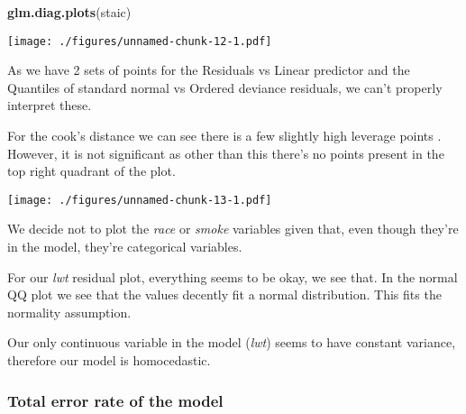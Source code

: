 \documentclass[]{article}
\newenvironment{Shaded}{\begin{snugshade}}{\end{snugshade}}
\newcommand{\DataTypeTok}[1]{\textcolor[rgb]{0.13,0.29,0.53}{#1}}
\newcommand{\DecValTok}[1]{\textcolor[rgb]{0.00,0.00,0.81}{#1}}
\newcommand{\KeywordTok}[1]{\textcolor[rgb]{0.13,0.29,0.53}{\textbf{#1}}}
\newcommand{\NormalTok}[1]{#1}
\newcommand{\OperatorTok}[1]{\textcolor[rgb]{0.81,0.36,0.00}{\textbf{#1}}}
\newcommand{\StringTok}[1]{\textcolor[rgb]{0.31,0.60,0.02}{#1}}
\begin{document}
\begin{Shaded}
\begin{Highlighting}[]
\KeywordTok{glm.diag.plots}\NormalTok{(staic)}
\end{Highlighting}
\end{Shaded}

\texttt{[image: ./figures/unnamed-chunk-12-1.pdf]}

As we have 2 sets of points for the Residuals vs Linear predictor and
the Quantiles of standard normal vs Ordered deviance residuals, we can't
properly interpret these.

For the cook's distance we can see there is a few slightly high leverage
points . However, it is not significant as other than this there's no
points present in the top right quadrant of the plot.

\newpage

\begin{Shaded}
\end{Shaded}

\texttt{[image: ./figures/unnamed-chunk-13-1.pdf]}

We decide not to plot the \emph{race} or \emph{smoke} variables given
that, even though they're in the model, they're categorical variables.

For our \emph{lwt} residual plot, everything seems to be okay, we see
that. In the normal QQ plot we see that the values decently fit a normal
distribution. This fits the normality assumption.

Our only continuous variable in the model (\emph{lwt}) seems to have
constant variance, therefore our model is homocedastic.

\newpage

\hypertarget{total-error-rate-of-the-model}{%
\subsubsection{Total error rate of the
model}\label{total-error-rate-of-the-model}}
\end{document}
